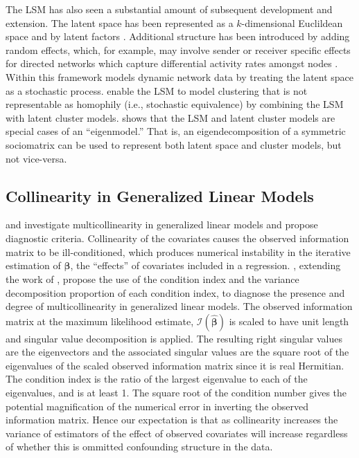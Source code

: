 \documentclass[12pt]{article}
\begin{document}
The LSM has also seen a substantial amount of subsequent development and extension. The latent space has been represented as a $k$-dimensional Euclildean space and by latent factors \citep{hoff2002latent, hoff2009multiplicative}. Additional structure has been introduced by adding random effects, which, for example, may involve sender or receiver specific effects for directed networks which capture differential activity rates amongst nodes \citep{hoff2003random}. Within this framework \cite{westveld2011mixed} models dynamic network data by treating the latent space as a stochastic process. \cite{handcock2007model} enable the LSM to model clustering that is not representable as homophily (i.e., stochastic equivalence) by combining the LSM with latent cluster models. \cite{hoff2008modeling} shows that the LSM and latent cluster models are special cases of an ``eigenmodel.'' That is, an eigendecomposition of a symmetric sociomatrix can be used to represent both latent space and cluster models, but not vice-versa.

\subsection{Collinearity in Generalized Linear Models}

\citep{mackinnon1989collinearity} and \citep{weissfeld1991multicollinearity} investigate multicollinearity in generalized linear models and propose diagnostic criteria. Collinearity of the covariates causes the observed information matrix to be ill-conditioned, which produces numerical instability in the iterative estimation of $\hat{\mathbf{\beta}}$, the ``effects'' of covariates included in a regression. \citep{weissfeld1991multicollinearity}, extending the work of \citep{davis1986example}, propose the use of the condition index and the variance decomposition proportion of each condition index, to diagnose the presence and degree of multicollinearity in generalized linear models. The observed information matrix at the maximum likelihood estimate, $\mathcal{I}(\hat{\mathbf{\beta}})$ is scaled to have unit length and singular value decomposition is applied. The resulting right singular values are the eigenvectors and the associated singular values are the square root of the eigenvalues of the scaled observed information matrix since it is real Hermitian. The condition index is the ratio of the largest eigenvalue to each of the eigenvalues, and is at least 1. The square root of the condition number gives the potential magnification of the numerical error in inverting the observed information matrix. Hence our expectation is that as collinearity increases the variance of estimators of the effect of observed covariates will increase regardless of whether this is ommitted confounding structure in the data.
\end{document}
